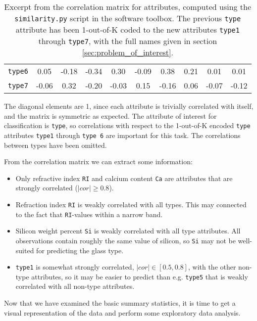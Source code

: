 \begin{table}[H]
\begin{tabular}{c||c c c c c c c c c}
\texttt{type6} & 0.05 & -0.18 & -0.34 & 0.30 & -0.09 & 0.38 & 0.21 & 0.01 & 0.01 \\


\texttt{type7} & -0.06 & 0.32 & -0.20 & -0.03 & 0.15 & -0.16 & 0.06 & -0.07 & -0.12 \\


    \end{tabular}
    \caption{Excerpt from the correlation matrix for attributes, computed using the \texttt{similarity.py} script in the software toolbox. The previous \texttt{type} attribute has been 1-out-of-K coded to the new attributes \texttt{type1} through \texttt{type7}, with the full names given in section \ref{sec:problem_of_interest}.}
    \label{tab:cor_matrix}
\end{table}

The diagonal elements are 1, since each attribute is trivially correlated with itself, and the matrix is symmetric as expected. The attribute of interest for classification is \texttt{type}, so correlations with respect to the 1-out-of-K encoded \texttt{type} attributes \texttt{type1} through \texttt{type 6} are important for this task. The correlations between types have been omitted.

From the correlation matrix we can extract some information:
\begin{itemize}
    
    \item Only refractive index \texttt{RI} and calcium content \texttt{Ca} are attributes that are strongly correlated ($|cor| \geq 0.8$).
    
    \item Refraction index \texttt{RI} is weakly correlated with all types. This may connected to the fact that \texttt{RI}-values within a narrow band.
    
    \item Silicon weight percent \texttt{Si} is weakly correlated with all type attributes. All observations contain roughly the same value of silicon, so \texttt{Si} may not be well-suited for predicting the glass type.
    
    \item \texttt{type1} is somewhat strongly correlated, $|cor| \in [0.5, 0.8]$, with the other non-type attributes, so it may be easier to predict than e.g. \texttt{type5} that is weakly correlated with all non-type attributes.
    
\end{itemize}

Now that we have examined the basic summary statistics, it is time to get a visual representation of the data and perform some exploratory data analysis.